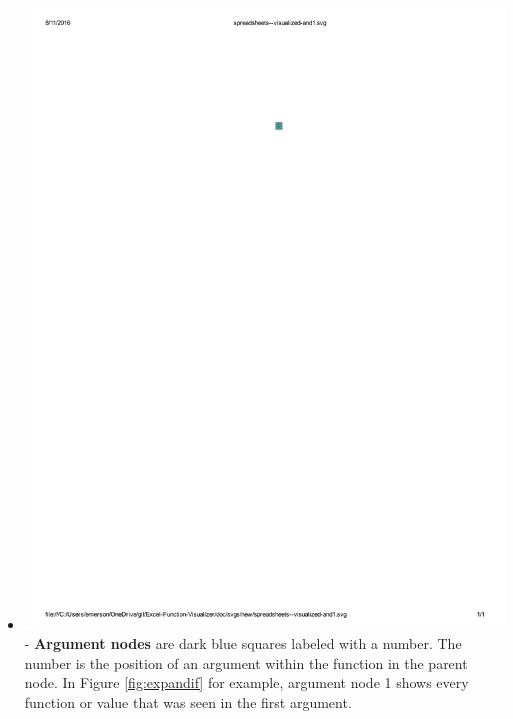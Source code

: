 \documentclass[conference]{IEEEtran}
\begin{document}
\begin{itemize}
		\item  \vspace{.25cm} \includegraphics{glossary-blue} - \textbf{Argument
			nodes} are dark blue squares labeled with a number. The number is the position
		of an argument within the function in the parent node. In Figure \ref{fig:expandif}
		for example, argument node 1 shows every function or value that was seen in
		the first argument.
		

\end{itemize}
\end{document}

